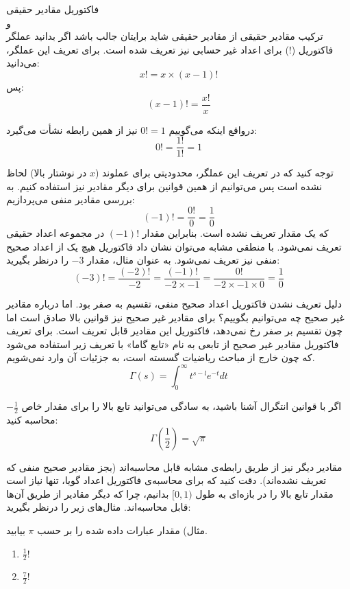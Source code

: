 \begin{extra}{
    فاکتوریل مقادیر حقیقی\\
    و\\
    ترکیب مقادیر حقیقی از مقادیر حقیقی
}
شاید برایتان جالب باشد اگر بدانید عملگر فاکتوریل ($!$)
برای اعداد غیر حسابی نیز تعریف شده است.
برای تعریف این عملگر، می‌دانید:
$$x! = x \times (x-1)!$$
پس:
$$(x-1)! = \frac{x!}{x}$$

درواقع اینکه می‌گوییم
$0! = 1$
نیز از همین رابطه نشأت می‌گیرد:
$$0! = \frac{1!}{1!} = 1$$

توجه کنید که در تعریف این عملگر، محدودیتی برای عملوند
($x$ در نوشتار بالا)
لحاظ نشده است پس می‌توانیم از همین قوانین برای دیگر مقادیر نیز استفاده کنیم.
به بررسی مقادیر منفی می‌پردازیم:
$$(-1)! = \frac{0!}{0} = \frac{1}{0}$$
که یک مقدار تعریف نشده است. بنابراین مقدار $(-1)!$ در مجموعه اعداد حقیقی تعریف نمی‌شود.
با منطقی مشابه می‌توان نشان داد فاکتوریل هیچ یک از اعداد صحیح منفی نیز تعریف نمی‌شود.
به عنوان مثال، مقدار $-3$ را درنظر بگیرید:
$$(-3)! = \frac{(-2)!}{-2} = \frac{(-1)!}{-2\times-1} = \frac{0!}{-2\times-1\times 0} = \frac{1}{0}$$

دلیل تعریف نشدن فاکتوریل اعداد صحیح منفی، تقسیم به صفر بود. اما درباره مقادیر غیر صحیح چه می‌توانیم بگوییم؟
برای مقادیر غیر صحیح نیز قوانین بالا صادق است اما چون تقسیم بر صفر رخ نمی‌دهد، فاکتوریل این مقادیر قابل تعریف است.
برای تعریف فاکتوریل مقادیر غیر صحیح از تابعی به نام «تابع گاما» با تعریف زیر استفاده می‌شود
که چون خارج از مباحث ریاضیات گسسته است، به جزئیات آن وارد نمی‌شویم.
$$\Gamma(s) = \int_0^\infty t^{s-l} e^{-t} dt$$

اگر با قوانین انتگرال آشنا باشید، به سادگی می‌توانید تابع بالا را برای مقدار خاص
$-\frac{1}{2}$
محاسبه کنید:
$$\Gamma(\frac{1}{2}) = \sqrt{\pi}$$

مقادیر دیگر نیز از طریق رابطه‌ی مشابه قابل محاسبه‌اند (بجز مقادیر صحیح منفی که تعریف نشده‌اند). دقت کنید که برای محاسبه‌ی 
فاکتوریل اعداد گویا، تنها نیاز است مقدار تابع بالا را در بازه‌ای به طول $[0,1)$ بدانیم، چرا که دیگر مقادیر از طریق آن‌ها قابل محاسبه‌اند.
مثال‌های زیر را درنظر بگیرید:

مثال) مقدار عبارات داده شده را بر حسب
$\pi$
بیابید.
\begin{enumerate}
    \item 
    $\frac{1}{2}!$

    \item 
    $\frac{7}{2}!$
    

\end{enumerate}
\end{extra}
